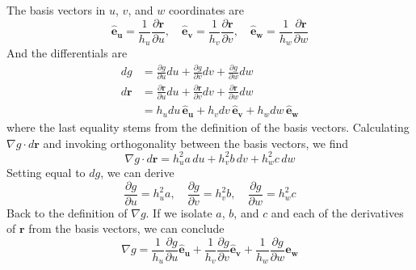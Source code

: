 \documentclass[a4paper]{article}
\begin{document}

The basis vectors in \( u \), \( v \), and \( w \) coordinates are
\[
	\pmb{\hat{e}_{u}} = \frac{1}{h_{u}}\frac{\partial \pmb{r}}{\partial u}, \quad \pmb{\hat{e}_{v}} = \frac{1}{h_{v}}\frac{\partial \pmb{r}}{\partial v}, \quad \pmb{\hat{e}_{w}} = \frac{1}{h_{w}}\frac{\partial \pmb{r}}{\partial w} 
\]
And the differentials are 
\begin{align*}
	dg & = \frac{\partial g}{\partial u}du + \frac{\partial g}{\partial v}dv + \frac{\partial g}{\partial w}dw \\
	d \pmb{r} & = \frac{\partial \pmb{r}}{\partial u}du + \frac{\partial \pmb{r}}{\partial v}dv + \frac{\partial \pmb{r}}{\partial w}dw \\ 
		  & = h_{u}du \, \pmb{\hat{e}_{u}} + h_{v}dv \, \pmb{\hat{e}_{v}} + h_{w}dw \, \pmb{\hat{e}_{w}}
\end{align*}
where the last equality stems from the definition of the basis vectors. Calculating \( \nabla g \cdot d \pmb{r} \) and invoking orthogonality between the basis vectors, we find
\[
	\nabla g \cdot d \pmb{r} = h^{2}_{u}a \, du + h^{2}_{v}b \, dv + h^{2}_{w}c \, dw 
\]
Setting equal to \( dg \), we can derive
\[
	\frac{\partial g}{\partial u} = h^{2}_{u}a, \quad \frac{\partial g}{\partial v} = h^{2}_{v}b, \quad \frac{\partial g}{\partial w} = h^{2}_{w}c 
\]
Back to the definition of \( \nabla g \). If we isolate \( a \), \( b \), and \( c \) and each of the derivatives of \( \pmb{r} \) from the basis vectors, we can conclude
\[
	\nabla g = \frac{1}{h_{u}}\frac{\partial g}{\partial u}\pmb{\hat{e}_{u}} + \frac{1}{h_{v}}\frac{\partial g}{\partial v}\pmb{\hat{e}_{v}} + \frac{1}{h_{w}}\frac{\partial g}{\partial w}\pmb{\hat{e}_{w}}
\]
\end{document}
